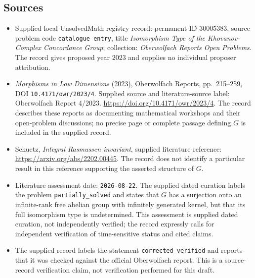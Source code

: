 \documentclass[11pt]{article}
\begin{document}
\subsection{Sources}
\begin{itemize}
\item Supplied local UnsolvedMath registry record: permanent ID \(30005383\), source problem code \texttt{catalogue entry}, title \emph{Isomorphism Type of the Khovanov-Complex Concordance Group}; collection: \emph{Oberwolfach Reports Open Problems}. The record gives proposed year \(2023\) and supplies no individual proposer attribution.
\item \emph{Morphisms in Low Dimensions} (2023), Oberwolfach Reports, pp.\ 215--259, DOI \texttt{10.4171/owr/2023/4}. Supplied source and literature-source label: Oberwolfach Report 4/2023. \url{https://doi.org/10.4171/owr/2023/4}. The record describes these reports as documenting mathematical workshops and their open-problem discussions; no precise page or complete passage defining \(G\) is included in the supplied record.
\item Schuetz, \emph{Integral Rasmussen invariant}, supplied literature reference: \url{https://arxiv.org/abs/2202.00445}. The record does not identify a particular result in this reference supporting the asserted structure of \(G\).
\item Literature assessment date: \texttt{2026-08-22}. The supplied dated curation labels the problem \texttt{partially\_solved} and states that \(G\) has a surjection onto an infinite-rank free abelian group with infinitely generated kernel, but that its full isomorphism type is undetermined. This assessment is supplied dated curation, not independently verified; the record expressly calls for independent verification of time-sensitive status and cited claims.
\item The supplied record labels the statement \texttt{corrected\_verified} and reports that it was checked against the official Oberwolfach report. This is a source-record verification claim, not verification performed for this draft.
\end{itemize}
\end{document}
